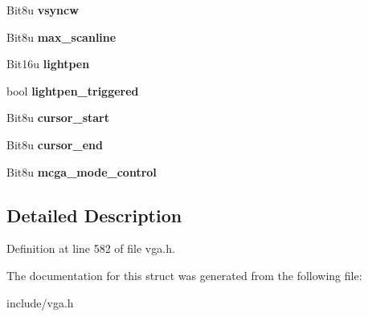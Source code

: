 \begin{DoxyCompactItemize}
\item 
\hypertarget{structVGA__OTHER_a6214860b81fc58e6a2b6712438cfdf87}{Bit8u {\bfseries vsyncw}}\label{structVGA__OTHER_a6214860b81fc58e6a2b6712438cfdf87}

\item 
\hypertarget{structVGA__OTHER_a5cda2fe9d1bbdb240fed75fbd4ebd54c}{Bit8u {\bfseries max\-\_\-scanline}}\label{structVGA__OTHER_a5cda2fe9d1bbdb240fed75fbd4ebd54c}

\item 
\hypertarget{structVGA__OTHER_aad2e4a57fdf43dd565398a1133880fe7}{Bit16u {\bfseries lightpen}}\label{structVGA__OTHER_aad2e4a57fdf43dd565398a1133880fe7}

\item 
\hypertarget{structVGA__OTHER_afdc8e6fe00dceb5d216a683d60e5c60d}{bool {\bfseries lightpen\-\_\-triggered}}\label{structVGA__OTHER_afdc8e6fe00dceb5d216a683d60e5c60d}

\item 
\hypertarget{structVGA__OTHER_ac1e5b1a383040b106970a2e96ffe7ba9}{Bit8u {\bfseries cursor\-\_\-start}}\label{structVGA__OTHER_ac1e5b1a383040b106970a2e96ffe7ba9}

\item 
\hypertarget{structVGA__OTHER_a15dd5380b25f09d7bd0e6eb8b8380cbe}{Bit8u {\bfseries cursor\-\_\-end}}\label{structVGA__OTHER_a15dd5380b25f09d7bd0e6eb8b8380cbe}

\item 
\hypertarget{structVGA__OTHER_aea3fa8ca72c5f2ffa8f3f5e40b110e27}{Bit8u {\bfseries mcga\-\_\-mode\-\_\-control}}\label{structVGA__OTHER_aea3fa8ca72c5f2ffa8f3f5e40b110e27}

\end{DoxyCompactItemize}


\subsection{Detailed Description}


Definition at line 582 of file vga.\-h.



The documentation for this struct was generated from the following file\-:\begin{DoxyCompactItemize}
\item 
include/vga.\-h\end{DoxyCompactItemize}
